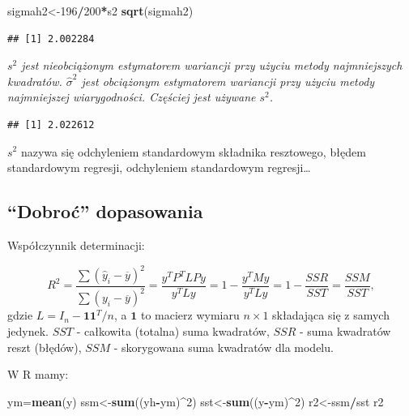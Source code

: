 \documentclass[]{article}
\newenvironment{Shaded}{\begin{snugshade}}{\end{snugshade}}
\newcommand{\KeywordTok}[1]{\textcolor[rgb]{0.13,0.29,0.53}{\textbf{#1}}}
\newcommand{\DecValTok}[1]{\textcolor[rgb]{0.00,0.00,0.81}{#1}}
\newcommand{\OperatorTok}[1]{\textcolor[rgb]{0.81,0.36,0.00}{\textbf{#1}}}
\newcommand{\NormalTok}[1]{#1}
\begin{document}
\begin{Shaded}
\begin{Highlighting}[]
\NormalTok{sigmah2<-}\DecValTok{196}\OperatorTok{/}\DecValTok{200}\OperatorTok{*}\NormalTok{s2}
\KeywordTok{sqrt}\NormalTok{(sigmah2)}
\end{Highlighting}
\end{Shaded}

\begin{verbatim}
## [1] 2.002284
\end{verbatim}

\emph{\(s^2\) jest nieobciążonym estymatorem wariancji przy użyciu
metody najmniejszych kwadratów. \(\hat{\sigma}^2\) jest obciążonym
estymatorem wariancji przy użyciu metody najmniejszej wiarygodności.
Częściej jest używane \(s^2\).}

\begin{Shaded}
\end{Shaded}

\begin{verbatim}
## [1] 2.022612
\end{verbatim}

\(s^2\) nazywa się odchyleniem standardowym składnika resztowego, błędem
standardowym regresji, odchyleniem standardowym regresji\ldots{}

\subsection{\texorpdfstring{``Dobroć''
dopasowania}{Dobroć dopasowania}}\label{dobroc-dopasowania}

Współczynnik determinacji:

\[ R^2 = \frac{\sum(\hat{y}_i-\overline{y})^2}{\sum(y_i-\overline{y})^2} = \frac{y ^T P ^T LPy}{y ^T Ly} = 1 - \frac{y^T My}{y^T Ly} = 1 - \frac{ SSR}{SST} = \frac{SSM}{SST},\]
gdzie \(L=I_n - \mathbf{1}\mathbf{1}^T/n\), a \(\mathbf{1}\) to macierz
wymiaru \(n\times 1\) składająca się z samych jedynek. \(SST\) -
całkowita (totalna) suma kwadratów, \(SSR\) - suma kwadratów reszt
(błędów), \(SSM\) - skorygowana suma kwadratów dla modelu.

W R mamy:

\begin{Shaded}
\begin{Highlighting}[]
\NormalTok{ym=}\KeywordTok{mean}\NormalTok{(y)}
\NormalTok{ssm<-}\KeywordTok{sum}\NormalTok{((yh}\OperatorTok{-}\NormalTok{ym)}\OperatorTok{^}\DecValTok{2}\NormalTok{)}
\NormalTok{sst<-}\KeywordTok{sum}\NormalTok{((y}\OperatorTok{-}\NormalTok{ym)}\OperatorTok{^}\DecValTok{2}\NormalTok{)}
\NormalTok{r2<-ssm}\OperatorTok{/}\NormalTok{sst}
\NormalTok{r2}
\end{Highlighting}
\end{Shaded}
\end{document}
